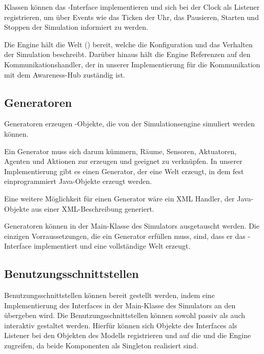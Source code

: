 Klassen können das -Interface implementieren und sich bei der Clock als Listener registrieren, um über Events wie das Ticken der Uhr, das Pausieren, Starten und Stoppen der Simulation informiert zu werden.

Die Engine hält die Welt () bereit, welche die Konfiguration und das Verhalten der Simulation beschreibt. Darüber hinaus hält die Engine Referenzen auf den Kommunikationshandler, der in unserer Implementierung für die Kommunikation mit dem Awareness-Hub zuständig ist.

\subsection{Generatoren}\label{subsec:concept_generators}
Generatoren erzeugen -Objekte, die von der Simulationsengine simuliert werden können.

Ein Generator muss sich darum kümmern, Räume, Sensoren, Aktuatoren, Agenten und Aktionen zur erzeugen und geeignet zu verknüpfen. In unserer Implementierung gibt es einen Generator, der eine Welt erzeugt, in dem fest einprogrammiert Java-Objekte erzeugt werden.

Eine weitere Möglichkeit für einen Generator wäre ein XML Handler, der Java-Objekte aus einer XML-Beschreibung generiert.

Generatoren können in der Main-Klasse des Simulators ausgetauscht werden. Die einzigen Vorraussetzungen, die ein Generator erfüllen muss, sind, dass er das -Interface implementiert und eine vollständige Welt erzeugt.


\subsection{Benutzungsschnittstellen}\label{subsec:concept_interfaces}
Benutzungsschnittstellen können bereit gestellt werden, indem eine Implementierung des Interfaces  in der Main-Klasse des Simulators an den  übergeben wird. Die Benutzungsschnittstellen können sowohl passiv als auch interaktiv gestaltet werden. Hierfür können sich Objekte des Interfaces als Listener bei den Objekten des Modells registrieren und auf die  und die Engine zugreifen, da beide Komponenten als Singleton realisiert sind.

